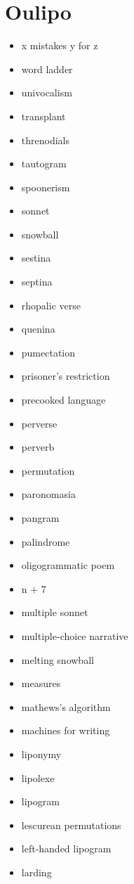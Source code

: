 
\chapter{Oulipo}
\label{app:oulipo}

\begin{multicols}{3}
\begin{itemize}
  \item x mistakes y for z
  \item word ladder
  \item univocalism
  \item transplant
  \item threnodials
  \item tautogram
  \item spoonerism
  \item sonnet
  \item snowball
  \item sestina
  \item septina
  \item rhopalic verse
  \item quenina
  \item pumectation
  \item prisoner's restriction
  \item precooked language
  \item perverse
  \item perverb
  \item permutation
  \item paronomasia
  \item pangram
  \item palindrome
  \item oligogrammatic poem
  \item n + 7
  \item multiple sonnet
  \item multiple-choice narrative
  \item melting snowball
  \item measures
  \item mathews's algorithm
  \item machines for writing
  \item liponymy
  \item lipolexe
  \item lipogram
  \item lescurean permutations
  \item left-handed lipogram
  \item larding

\end{itemize}
\end{multicols}
